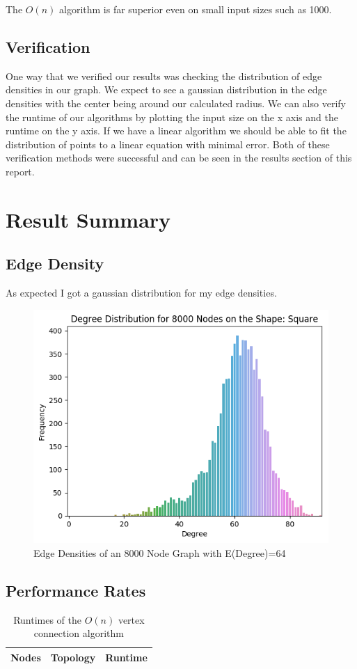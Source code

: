 \documentclass{article}
\begin{document}
	  The $O(n)$ algorithm is far superior even on small input sizes such as 1000.

	\subsection{Verification}
	One way that we verified our results was checking the distribution of edge densities in our graph.
	We expect to see a gaussian distribution in the edge densities with the center being around our calculated radius.
	We can also verify the runtime of our algorithms by plotting the input size on the x axis and the runtime on the y axis.
	If we have a linear algorithm we should be able to fit the distribution of points to a linear equation with minimal error.
	Both of these verification methods were successful and can be seen in the results section of this report.

\section{Result Summary}
  \subsection{Edge Density}
  As expected I got a gaussian distribution for my edge densities.
  \begin{figure}[H]
  \centering
  \includegraphics[width=1 \textwidth]{square/edge_density/8000_64.png}
  \caption{Edge Densities of an 8000 Node Graph with E(Degree)=64}
  \end{figure}

  \subsection{Performance Rates}
  \begin{center}
	  \begin{table}[H]
		  \begin{tabular}{ |c|c|c| }
			\hline
			Nodes & Topology & Runtime \\
			\hline
		  \end{tabular}
		  \caption{Runtimes of the $O(n)$ vertex connection algorithm}
	  \end{table}
  \end{center}

\printbibliography
\end{document}
